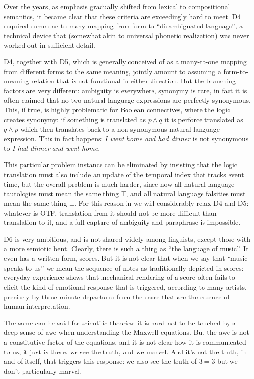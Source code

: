 \documentclass[output=paper]{langscibook}
\begin{document}
Over the years, as emphasis gradually shifted from lexical to compositional
semantics, it became clear that these criteria are exceedingly hard to meet:
D4 required some one-to-many mapping from form to ``disambiguated language'', a
technical device that (somewhat akin to universal phonetic realization) was
never worked out in sufficient detail.

D4, together with D5, which is generally conceived of as a many-to-one mapping
from different forms to the same meaning, jointly amount to assuming a
form-to-meaning relation that is not functional in either direction. But the
branching factors are very different: ambiguity is everywhere, synonymy is
rare, in fact it is often claimed that no two natural language expressions are
perfectly synonymous. This, if true, is highly problematic for Boolean
connectives, where the logic creates synonymy: if something is translated as
$p \wedge q$ it is perforce translated as $q \wedge p$ which then translates
back to a non-synonymous natural language expression. This in fact happens:
\textit{I went home and had dinner} is not synonymous to \textit{I had dinner and
  went home}.

This particular problem instance can be eliminated by insisting that the logic
translation must also include an update of the temporal index that tracks event
time, but the overall problem is much harder, since now all natural language
tautologies must mean the same thing $\top$, and all natural language
falsities must mean the same thing $\bot$. For this reason in
 we will considerably relax D4 and D5: whatever is OTF,
translation from it should not be more difficult than translation to it, and
a full capture of ambiguity and paraphrase is impossible. 

 D6 is very ambitious, and is not shared widely among
linguists, except those with a more semiotic bent. Clearly, there is such a
thing as ``the language of music''. It even has a written form, scores. But it
is not clear that when we say that ``music speaks to us'' we mean the sequence
of notes as traditionally depicted in scores: everyday experience shows that
mechanical rendering of a score often fails to elicit the kind of emotional
response that is triggered, according to many artists, precisely by those minute
departures from the score that are the essence of human interpretation.

The same can be said for scientific theories: it is hard not to be touched by
a deep sense of awe when understanding the Maxwell equations. But the awe is
not a constitutive factor of the equations, and it is not clear how it is
communicated to us, it just is there: we see the truth, and we marvel. And
it's not the truth, in and of itself, that triggers this response: we also see
the truth of $3=3$ but we don't particularly marvel.
\end{document}
